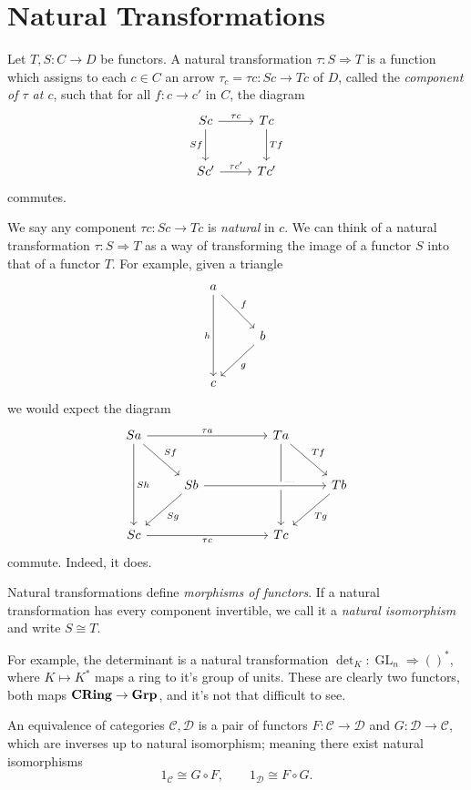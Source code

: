 \section{Natural Transformations}
\begin{definition}\label{dfn:1.4}
	Let $T,S : C \to D$ be functors. A natural transformation $\tau : S \Rightarrow T$ is a function which assigns to each $c\in C$ an arrow $\tau _c=\tau c : Sc \to Tc$ of $D$, called the \emph{component of $\tau $ at $c$}, such that for all $f : c \to c'$ in $C$, the diagram
	\[\begin{tikzcd}[row sep = 2.5em, column sep = 2.5em]
		Sc\ar[" \tau c ", r] \ar[" Sf "', d] &Tc\ar[" Tf ", d] \\
		Sc'\ar[" \tau c' ", r] &Tc'
	\end{tikzcd}\]
	commutes.
\end{definition}

We say any component $\tau c : Sc \to Tc$ is \emph{natural} in $c$. We can think of a natural transformation $\tau : S \Rightarrow T$ as a way of transforming the image of a functor $S$ into that of a functor $T$. For example, given a triangle
\[\begin{tikzcd}[row sep = 2.5em, column sep = 2.5em]
	a \ar[" f ", dr] \ar[" h "', dd] \\
	&b \ar[" g ", dl] \\
	c
\end{tikzcd}\]
we would expect the diagram
\[\begin{tikzcd}[row sep = 2.5em, column sep = 2.5em]
	Sa\ar[" \tau a ", rrr] \ar[" Sf ", dr] \ar[" Sh ", dd] &&&Ta\ar[" Tf ", dr] \ar[" Th ", dd] \\
							       &Sb \ar[" Sg ", dl] &&&Tb \ar[" Tg ", dl] \\
	Sc\ar[" \tau c "', rrr] &&&Tc
	\arrow[from=2-2, to=2-5, crossing over]
\end{tikzcd}\]
commute. Indeed, it does.

Natural transformations define \emph{morphisms of functors}. If a natural transformation has every component invertible, we call it a \emph{natural isomorphism} and write $S\cong T$.

For example, the determinant is a natural transformation $\det_K : \operatorname{GL}_n \Rightarrow \left(  \right) ^*$, where $K\mapsto K^*$ maps a ring to it's group of units. These are clearly two functors, both maps $\mathbf{C}\mathbf{Ring} \to \mathbf{Grp} $, and it's not that difficult to see.

\begin{definition}\label{dfn:4}
	An equivalence of categories $\mathcal{C} ,\mathcal{D} $ is a pair of functors $F : \mathcal{C}  \to \mathcal{D} $ and $G : \mathcal{D}  \to \mathcal{C} $, which are inverses up to natural isomorphism; meaning there exist natural isomorphisms
	\[
		1_\mathcal{C} \cong G\circ F,\qquad 1_\mathcal{D} \cong  F\circ G
	.\]
\end{definition}

